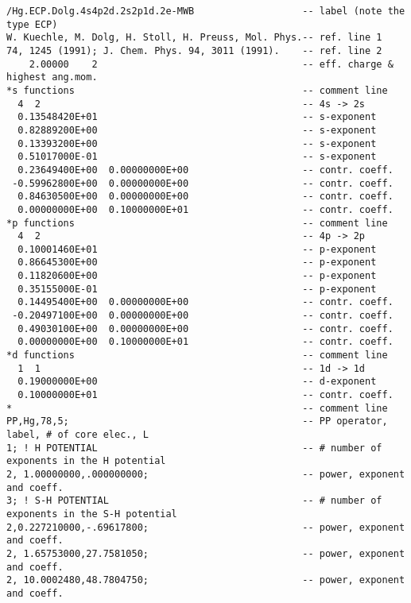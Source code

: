 {\small
\begin{verbatim}
/Hg.ECP.Dolg.4s4p2d.2s2p1d.2e-MWB                   -- label (note the type ECP)
W. Kuechle, M. Dolg, H. Stoll, H. Preuss, Mol. Phys.-- ref. line 1 
74, 1245 (1991); J. Chem. Phys. 94, 3011 (1991).    -- ref. line 2
    2.00000    2                                    -- eff. charge & highest ang.mom.
*s functions                                        -- comment line
  4  2                                              -- 4s -> 2s
  0.13548420E+01                                    -- s-exponent
  0.82889200E+00                                    -- s-exponent  
  0.13393200E+00                                    -- s-exponent
  0.51017000E-01                                    -- s-exponent
  0.23649400E+00  0.00000000E+00                    -- contr. coeff.
 -0.59962800E+00  0.00000000E+00                    -- contr. coeff.
  0.84630500E+00  0.00000000E+00                    -- contr. coeff.
  0.00000000E+00  0.10000000E+01                    -- contr. coeff.
*p functions                                        -- comment line
  4  2                                              -- 4p -> 2p
  0.10001460E+01                                    -- p-exponent
  0.86645300E+00                                    -- p-exponent
  0.11820600E+00                                    -- p-exponent
  0.35155000E-01                                    -- p-exponent
  0.14495400E+00  0.00000000E+00                    -- contr. coeff.
 -0.20497100E+00  0.00000000E+00                    -- contr. coeff.
  0.49030100E+00  0.00000000E+00                    -- contr. coeff.
  0.00000000E+00  0.10000000E+01                    -- contr. coeff.
*d functions                                        -- comment line
  1  1                                              -- 1d -> 1d
  0.19000000E+00                                    -- d-exponent
  0.10000000E+01                                    -- contr. coeff.
*                                                   -- comment line
PP,Hg,78,5;                                         -- PP operator, label, # of core elec., L
1; ! H POTENTIAL                                    -- # number of exponents in the H potential
2, 1.00000000,.000000000;                           -- power, exponent and coeff.
3; ! S-H POTENTIAL                                  -- # number of exponents in the S-H potential
2,0.227210000,-.69617800;                           -- power, exponent and coeff.
2, 1.65753000,27.7581050;                           -- power, exponent and coeff.
2, 10.0002480,48.7804750;                           -- power, exponent and coeff.

\end{verbatim}}
